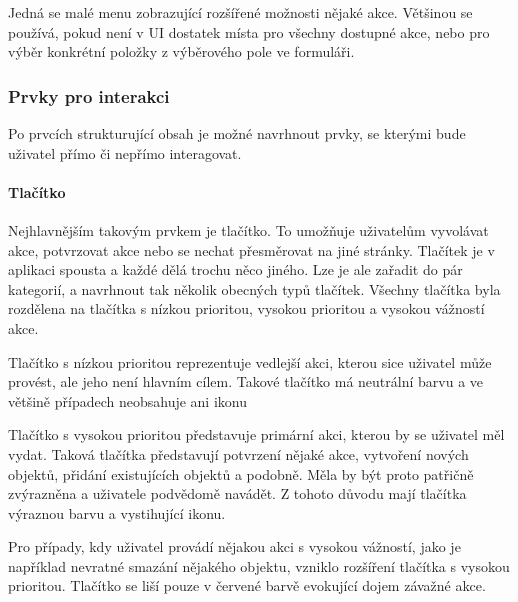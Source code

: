 			Jedná se malé menu zobrazující rozšířené možnosti nějaké akce.
			Většinou se používá, pokud není v \ac{UI} dostatek
			místa pro všechny dostupné akce, nebo pro výběr konkrétní položky z výběrového pole ve formuláři.


		\subsubsection{Prvky pro interakci}

		Po prvcích strukturující obsah je možné navrhnout prvky, se kterými bude uživatel přímo či nepřímo interagovat.

			\paragraph{Tlačítko}

			Nejhlavnějším takovým prvkem je tlačítko.
			To umožňuje uživatelům vyvolávat akce, potvrzovat akce nebo se nechat přesměrovat na jiné stránky.
			Tlačítek je v aplikaci spousta a každé dělá trochu něco jiného.
			Lze je ale zařadit do pár kategorií, a navrhnout tak několik obecných typů tlačítek.
			Všechny tlačítka byla rozdělena na tlačítka s nízkou prioritou, vysokou prioritou a vysokou vážností akce.

			Tlačítko s nízkou prioritou reprezentuje vedlejší akci, kterou sice uživatel může provést, ale jeho není hlavním cílem.
			Takové tlačítko má neutrální barvu a ve většině případech neobsahuje ani ikonu


			Tlačítko s vysokou prioritou představuje primární akci, kterou by se uživatel měl vydat.
			Taková tlačítka představují potvrzení nějaké akce, vytvoření nových objektů, přidání existujících objektů a
			podobně.
			Měla by být proto patřičně zvýrazněna a uživatele podvědomě navádět.
			Z tohoto důvodu mají tlačítka výraznou barvu a vystihující ikonu.


			Pro případy, kdy uživatel provádí nějakou akci s vysokou vážností, jako je například nevratné smazání nějakého
			objektu, vzniklo rozšíření tlačítka s vysokou prioritou.
			Tlačítko se liší pouze v červené barvě evokující dojem závažné akce.


